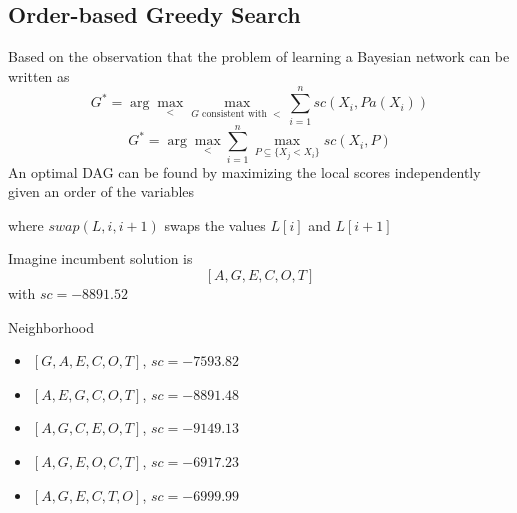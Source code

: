 \subsection{Order-based Greedy Search}
	\begin{frame}
		Based on the observation that the problem of learning a Bayesian network can be written as
			\[ G^* = \arg \max_{<} \max_{G \text{ consistent with } <} \sum_{i=1}^{n} {sc}( X_i , {Pa}( X_i ) ) \]
			\[ G^* = \arg \max_{<} \sum_{i=1}^{n} \max_{P \subseteq \{ X_j < X_i \}} {sc}( X_i , P ) \]
		An optimal DAG can be found by maximizing the local scores \alert{independently} given an order of the variables
	\end{frame}
	
	\begin{frame}
		
		where ${swap}( L , i , i + 1 )$ swaps the values $L[ i ]$ and $L[ i + 1 ]$
	\end{frame}
	
	\begin{frame}
		Imagine incumbent solution is
			\[ [ A , G , E , C , O , T ] \]
		with ${sc} = -8891.52$
		\begin{block}{Neighborhood}
			\begin{itemize}
				\item $[ G , A , E , C , O , T ]$, $sc = -7593.82$
				\item $[ A , E , G , C , O , T ]$, $sc = -8891.48$
				\item $[ A , G , C , E , O , T ]$, $sc = -9149.13$
				\item $[ A , G , E , O , C , T ]$, $sc = -6917.23$
				\item $[ A , G , E , C , T , O ]$, $sc = -6999.99$
			\end{itemize}
		\end{block}
	\end{frame}